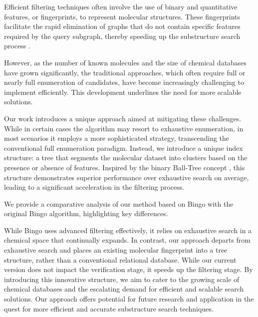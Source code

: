 Efficient filtering techniques often involve the use of binary and quantitative features, or fingerprints, to represent molecular 
structures. These fingerprints facilitate the rapid elimination of graphs that do not contain specific features required by the 
query subgraph, thereby speeding up the substructure search process \cite{bonchi2011, klein2014}.

However, as the number of known molecules and the size of chemical databases have grown significantly, the traditional approaches, 
which often require full or nearly full enumeration of candidates, have become increasingly challenging to implement efficiently. 
This development underlines the need for more scalable solutions.

Our work introduces a unique approach aimed at mitigating these challenges. While in certain cases the algorithm may resort to exhaustive enumeration, in most scenarios it employs a more sophisticated strategy, transcending the conventional full enumeration paradigm. Instead, we introduce a unique index structure: a tree that segments the molecular dataset into clusters based on the presence or 
absence of features. Inspired by the binary Ball-Tree concept \cite{omohundro1989, clarkson1994}, this structure demonstrates 
superior performance over exhaustive search on average, leading to a significant acceleration in the filtering process.

We provide a comparative analysis of our method based on Bingo \cite{Pavlov2010} with the original Bingo algorithm, highlighting key differences. 

While Bingo uses advanced filtering effectively, it relies on exhaustive search in a chemical space that continually expands. In contrast, 
our approach departs from exhaustive search and places an existing molecular fingerprint into a tree structure, rather than a 
conventional relational database. While our current version does not impact the verification stage, it speeds up the filtering stage.
By introducing this innovative structure, we aim to cater to the growing scale of chemical databases and the escalating demand 
for efficient and scalable search solutions. Our approach offers potential for future research and application in the quest 
for more efficient and accurate substructure search techniques.
